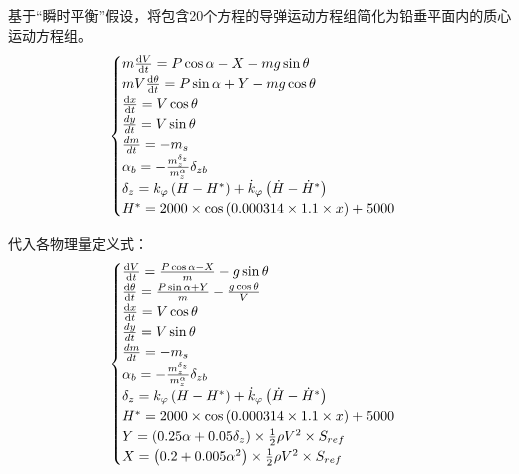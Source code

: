 \documentclass[UTF8]{ctexart}
\begin{document}
基于“瞬时平衡”假设，将包含20个方程的导弹运动方程组简化为铅垂平面内的质心运动方程组。
\begin{align}
    \begin{cases}
        m\frac{\mathrm{d}V}{\mathrm{d}t}=P\cos\alpha-X-mg\sin\theta\hfill                                     \\
        mV\frac{\mathrm{d}\theta}{\mathrm{d}t}=P\sin\alpha+Y-mg\cos\theta\hfill                               \\
        \frac{\mathrm{d}x}{\mathrm{d}t}=V\cos\theta \hfill                                                    \\
        \frac{dy}{dt}=V\sin\theta \hfill                                                                      \\
        \frac{dm}{dt}=-m_{s} \hfill                                                                           \\
        \alpha_b=-\frac{m_{z}^{\delta_z}}{m_{z}^{\alpha}}\delta_{zb} \hfill                                   \\
        \delta_z = k_\varphi \left(H-H^{*}\right) +\dot{k}_{\varphi} \left(\dot{H} -\dot{H}^{*}\right) \hfill \\
        H^{*}=2000\times \cos\left(0.000314\times1.1\times x\right)+5000\hfill
    \end{cases}
\end{align}

代入各物理量定义式：
\begin{align}
    \begin{cases}
        \frac{\mathrm{d}V}{\mathrm{d}t}=\frac{P\cos\alpha-X}{m}-g\sin\theta\hfill                             \\
        \frac{\mathrm{d}\theta}{\mathrm{d}t}=\frac{P\sin\alpha+Y}{m}-\frac{g\cos\theta}{V}\hfill                      \\
        \frac{\mathrm{d}x}{\mathrm{d}t}=V\cos\theta \hfill                                                    \\
        \frac{dy}{dt}=V\sin\theta \hfill                                                                      \\
        \frac{dm}{dt}=-m_{s} \hfill                                                                           \\
        \alpha_b=-\frac{m_{z}^{\delta_z}}{m_{z}^{\alpha}}\delta_{zb} \hfill                                   \\
        \delta_z = k_\varphi \left(H-H^{*}\right) +\dot{k}_{\varphi} \left(\dot{H} -\dot{H}^{*}\right) \hfill \\
        H^{*}=2000\times \cos\left(0.000314\times1.1\times x\right)+5000\hfill                                \\
        Y=\left(0.25\alpha+0.05\delta_{z}\right)\times \frac{1}{2}\rho V^{2} \times S_{ref}\\
        X=\left(0.2+0.005\alpha^2\right)\times \frac{1}{2}\rho V^{2} \times S_{ref}
    \end{cases}
\end{align}
\end{document}
